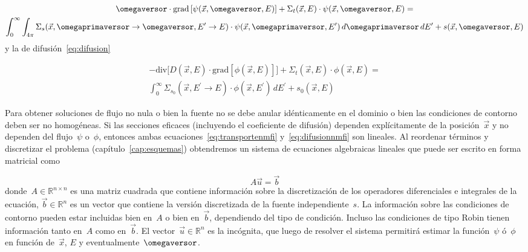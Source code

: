 \begin{multline}
\label{eq:transportenmfi}
\omegaversor \cdot \text{grad} \left[ \psi(\vec{x}, \omegaversor, E) \right]
 + \Sigma_t(\vec{x}, E) \cdot \psi(\vec{x}, \omegaversor, E) = \\
\int_{0}^{\infty} \int_{4\pi} \Sigma_s(\vec{x}, \omegaprimaversor \rightarrow \omegaversor, E^\prime \rightarrow E) \cdot \psi(\vec{x}, \omegaprimaversor, E^\prime) \, d\omegaprimaversor \, dE^\prime
+ s(\vec{x}, \omegaversor, E)
\end{multline}
%
y la de difusión~\eqref{eq:difusion}

\begin{multline}
\label{eq:difusionnmfi}
 - \text{div} \Big[ D(\vec{x}, E) \cdot \text{grad} \left[ \phi(\vec{x}, E) \right] \Big]
 + \Sigma_t(\vec{x}, E) \cdot \phi(\vec{x}, E)
 = \\
\int_{0}^{\infty} \Sigma_{s_0}(\vec{x}, E^{\prime} \rightarrow E)  \cdot \phi(\vec{x}, E^\prime) \, dE^\prime
+ s_0(\vec{x}, E)
\end{multline}

Para obtener soluciones de flujo no nula o bien la fuente no se debe anular idénticamente en el dominio o bien las condiciones de contorno deben ser no homogéneas. Si las secciones eficaces (incluyendo el coeficiente de difusión) dependen explícitamente de la posición~$\vec{x}$ y no dependen del flujo~$\psi$ o~$\phi$, entonces ambas ecuaciones~\eqref{eq:transportenmfi} y~\eqref{eq:difusionnmfi} son lineales. Al reordenar términos y discretizar el problema (capítulo~\ref{cap:esquemas}) obtendremos un sistema de ecuaciones algebraicas lineales que puede ser escrito en forma matricial como

\begin{equation*}
 A \vec{u} = \vec{b}
\end{equation*}
%
donde~$A \in \mathbb{R}^{n \times n}$ es una matriz cuadrada que contiene información sobre  la discretización de los operadores diferenciales e integrales de la ecuación,  $\vec{b} \in \mathbb{R}^n$ es un vector que contiene la versión discretizada de la fuente  independiente~$s$. La información sobre las condiciones de contorno pueden estar incluidas bien en~$A$ o bien en~$\vec{b}$, dependiendo del tipo de condición. Incluso las condiciones de tipo Robin tienen información tanto en~$A$ como en~$\vec{b}$. El vector~$\vec{u} \in \mathbb{R}^n$ es la incógnita, que luego de resolver el sistema permitirá estimar la función~$\psi$ ó~$\phi$ en  función de~$\vec{x}$, $E$ y eventualmente~$\omegaversor$.

